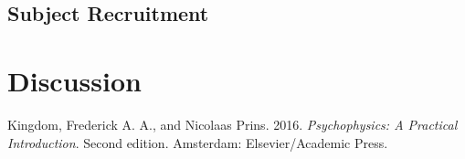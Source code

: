 \documentclass[
  letterpaper,
  DIV=11,
  numbers=noendperiod]{scrartcl}
\newlength{\cslhangindent}
\newenvironment{CSLReferences}[2] %
 {\begin{list}{}{%
  \setlength{\itemindent}{0pt}
  \setlength{\leftmargin}{0pt}
  \setlength{\parsep}{0pt}
  \ifodd #1
   \setlength{\leftmargin}{\cslhangindent}
   \setlength{\itemindent}{-1\cslhangindent}
  \fi
  \setlength{\itemsep}{#2\baselineskip}}}
 {\end{list}}
\begin{document}
\subsection{Subject Recruitment}\label{subject-recruitment}

\section*{Discussion}\label{discussion}

\label{refs}
\begin{CSLReferences}{1}{0}
Kingdom, Frederick A. A., and Nicolaas Prins. 2016. \emph{Psychophysics:
A Practical Introduction}. Second edition. Amsterdam: Elsevier/Academic
Press.

\end{CSLReferences}
\end{document}
